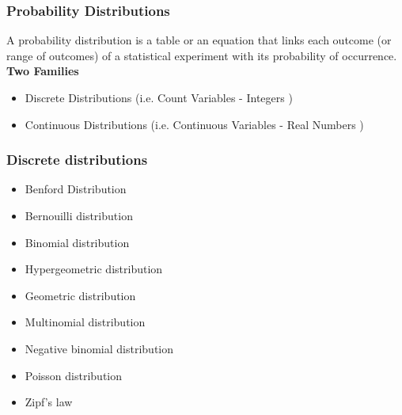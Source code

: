 \documentclass[MAIN.tex]{subfiles}
\begin{document}
 
	\begin{frame}
		\frametitle{Probability Distributions}
	A probability distribution is a table or an equation that links each outcome (or range of outcomes) 
	of a statistical experiment with its probability of occurrence.\\
	\bigskip
	\textbf{Two Families}
	\begin{itemize}
	\item Discrete Distributions (i.e. Count Variables  - Integers )
	\item Continuous Distributions (i.e. Continuous Variables - Real Numbers )
	\end{itemize}
	
	\end{frame}
\begin{frame}
	\frametitle{Discrete distributions}
\begin{itemize}
\item Benford Distribution
\item Bernouilli distribution
\item Binomial distribution
\item Hypergeometric distribution
\item Geometric distribution
\item Multinomial distribution
\item Negative binomial distribution
\item Poisson distribution
\item Zipf's law
\end{itemize}
\end{frame}
\end{document}
